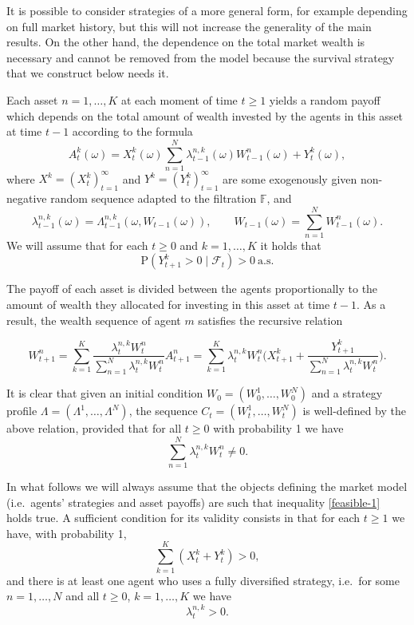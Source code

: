 \documentclass[a4paper,11pt,english]{article}
\theoremstyle{definition}
\renewcommand{\P}{\mathrm{P}}
\newcommand{\F}{\mathcal{F}}
\begin{document}
It is possible to consider strategies of a more general form, for example
depending on full market history, but this will not increase the generality
of the main results. On the other hand, the dependence on the total market
wealth is necessary and cannot be removed from the model because the
survival strategy that we construct below needs it.

Each asset $n=1,\ldots,K$ at each moment of time $t\ge 1$ yields a random
payoff which depends on the total amount of wealth invested by the agents in
this asset at time $t-1$ according to the formula
\begin{equation}
A_t^k(\omega) = X_t^k(\omega) \sum_{n=1}^N
\lambda_{t-1}^{n,k}(\omega)W_{t-1}^n(\omega) + Y_t^k(\omega),\label{P}
\end{equation}
where $X^k = (X_t^k)_{t=1}^\infty$ and $Y^k = (Y_t^k)_{t=1}^\infty$ are some exogenously
given non-negative random sequence adapted to the filtration $\mathbb{F}$, and
\[
\lambda_{t-1}^{n,k}(\omega) = \Lambda_{t-1}^{n,k}(\omega,
W_{t-1}(\omega)),\qquad W_{t-1}(\omega) = \sum_{n=1}^N W_{t-1}^n(\omega).
\]
We will assume that for each $t\ge 0$ and
$k=1,\ldots,K$ it holds that
\begin{equation}
\P(Y_{t+1}^k >0 \mid \F_t) >0\ \text{a.s.}\label{Y-positive}
\end{equation}

The payoff of each asset is divided between the agents proportionally to the amount of
wealth they allocated for investing in this asset at time $t-1$. As a result, the wealth
sequence of agent $m$ satisfies the recursive relation

\begin{equation}
W_{t+1}^n = \sum_{k=1}^K \frac{\lambda_t^{n,k} W_t^n}{\sum_{n=1}^N
\lambda_t^{n,k} W_t^n} A_{t+1}^n = \sum_{k=1}^K\lambda_t^{n,k} W_t^n
\biggl(X_{t+1}^k + \frac{Y_{t+1}^k}{\sum_{n=1}^N \lambda_t^{n,k} W_t^n}
\biggr).\label{capital}
\end{equation}

It is clear that given an initial condition $W_0=(W_0^1,\ldots,W_0^N)$ and a
strategy profile $\Lambda=(\Lambda^1,\ldots,\Lambda^N)$, the sequence
$C_t=(W_t^1,\ldots,W_t^N)$ is well-defined by the above relation, provided
that for all $t \ge 0$ with probability 1 we have
\begin{equation}
\sum_{n=1}^N \lambda_t^{n,k} W_t^n \neq 0.\label{feasible-1}
\end{equation}

In what follows we will always assume that the objects defining the
market model (i.e.\ agents' strategies and asset payoffs) are such
that inequality \eqref{feasible-1} holds true. A  sufficient condition for its
validity consists in that for each $t\ge 1$ we have, with probability 1,
\begin{equation}
\label{feasible-2}
\sum_{k=1}^K (X_t^k + Y_t^k) >0,
\end{equation}
and there is at least one agent who uses a fully diversified strategy, i.e.\
for some $n=1,\ldots,N$ and all $t\ge 0$, $k=1,\ldots, K$ we have
\begin{equation}
\label{feasible-3}
\lambda_t^{n,k} > 0.
\end{equation}
\end{document}
